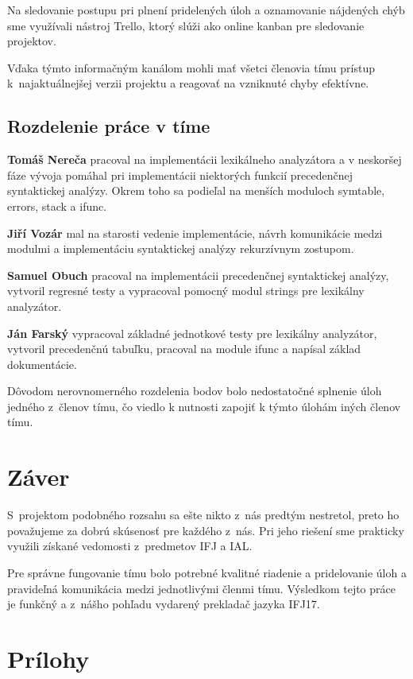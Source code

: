 \documentclass{article}
\begin{document}
        Na sledovanie postupu pri plnení pridelených úloh a oznamovanie nájdených chýb 
        sme využívali nástroj Trello, ktorý slúži ako online kanban pre sledovanie projektov. 
        
        Vďaka týmto informačným kanálom mohli mať všetci členovia tímu prístup k~najaktuálnejšej
        verzii projektu a reagovať na vzniknuté chyby efektívne.

        \subsection{Rozdelenie práce v tíme}

        \textbf{Tomáš Nereča} pracoval na implementácii lexikálneho analyzátora a v neskoršej fáze vývoja pomáhal pri implementácii niektorých
        funkcií precedenčnej syntaktickej analýzy. Okrem toho sa podieľal na menších moduloch symtable, errors, stack a ifunc.  

        \textbf{Jiří Vozár} mal na starosti vedenie implementácie, návrh komunikácie medzi modulmi a implementáciu syntaktickej analýzy rekurzívnym zostupom.

        \textbf{Samuel Obuch} pracoval na implementácii precedenčnej syntaktickej analýzy, vytvoril regresné testy a vypracoval pomocný modul strings pre lexikálny analyzátor.

        \textbf{Ján Farský} vypracoval základné jednotkové testy pre lexikálny analyzátor, vytvoril precedenčnú tabuľku, pracoval na module ifunc a napísal základ dokumentácie.

        Dôvodom nerovnomerného rozdelenia bodov bolo nedostatočné splnenie úloh jedného 
        z~členov tímu, čo viedlo k nutnosti zapojiť k týmto úlohám iných členov tímu.

    \section{Záver}
    S~projektom podobného rozsahu sa ešte nikto z~nás predtým nestretol, preto ho považujeme za dobrú
    skúsenosť pre každého z~nás. Pri jeho riešení sme prakticky využili získané vedomosti z~predmetov 
    IFJ a IAL.
    
    Pre správne fungovanie tímu bolo potrebné kvalitné riadenie a pridelovanie úloh a pravideľná
    komunikácia medzi jednotlivými členmi tímu. Výsledkom tejto práce je funkčný a z~nášho pohľadu vydarený 
    prekladač jazyka IFJ17.
    
    \newpage
    \section{Prílohy}
\end{document}
